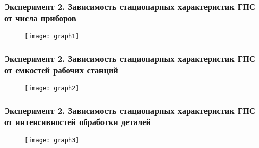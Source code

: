 
\begin{frame} \frametitle{Эксперимент 2. Зависимость стационарных характеристик ГПС от числа приборов}
\begin{figure}[H]
  \centering
  \texttt{[image: graph1]}
  \label{fig:main}
\end{figure}
\end{frame}


\begin{frame} \frametitle{Эксперимент 2. Зависимость стационарных характеристик ГПС от емкостей рабочих станций}
\begin{figure}[H]
  \centering
  \texttt{[image: graph2]}
  \label{fig:main}
\end{figure}
\end{frame}


\begin{frame} \frametitle{Эксперимент 2. Зависимость стационарных характеристик ГПС от интенсивностей обработки деталей}
\begin{figure}[H]
  \centering
  \texttt{[image: graph3]}
  \label{fig:main}
\end{figure}
\end{frame}
